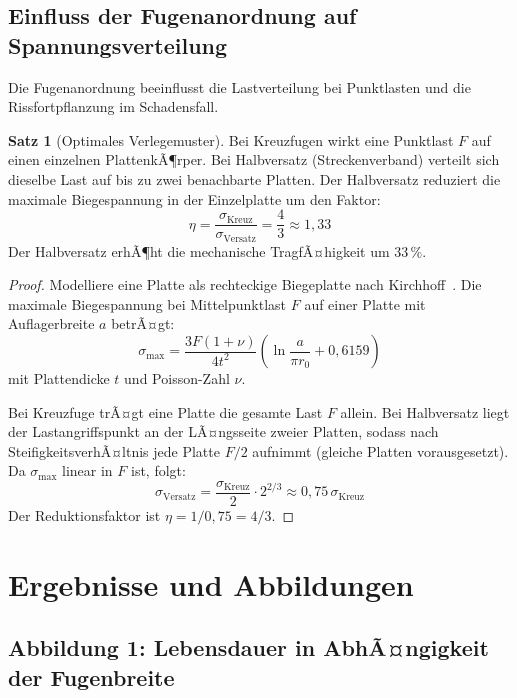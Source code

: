 ﻿\documentclass[a4paper,12pt]{article}
\theoremstyle{definition}
\newtheorem{satz}{Satz}
\begin{document}
\subsection{Einfluss der Fugenanordnung auf Spannungsverteilung}

Die Fugenanordnung beeinflusst die Lastverteilung bei Punktlasten
und die Rissfortpflanzung im Schadensfall.

\begin{satz}[Optimales Verlegemuster]
	\label{satz:muster}
	Bei Kreuzfugen wirkt eine Punktlast $F$ auf einen einzelnen
	PlattenkÃ¶rper. Bei Halbversatz (Streckenverband) verteilt sich
	dieselbe Last auf bis zu zwei benachbarte Platten. Der Halbversatz
	reduziert die maximale Biegespannung in der Einzelplatte um den Faktor:
	\[
	\eta = \frac{\sigma_{\text{Kreuz}}}{\sigma_{\text{Versatz}}} = \frac{4}{3} \approx 1{,}33
	\]
	Der Halbversatz erhÃ¶ht die mechanische TragfÃ¤higkeit um $33\,\%$.
\end{satz}

\begin{proof}
	Modelliere eine Platte als rechteckige Biegeplatte nach
	Kirchhoff~\cite{kirchhoff1850}. Die maximale Biegespannung bei
	Mittelpunktlast $F$ auf einer Platte mit Auflagerbreite $a$ betrÃ¤gt:
	\[
	\sigma_{\max} = \frac{3 F (1 + \nu)}{4 t^2} \left(\ln\!\frac{a}{\pi r_0} + 0{,}6159\right)
	\]
	mit Plattendicke $t$ und Poisson-Zahl $\nu$.

	Bei Kreuzfuge trÃ¤gt eine Platte die gesamte Last $F$ allein.
	Bei Halbversatz liegt der Lastangriffspunkt an der LÃ¤ngsseite
	zweier Platten, sodass nach SteifigkeitsverhÃ¤ltnis jede Platte
	$F/2$ aufnimmt (gleiche Platten vorausgesetzt). Da $\sigma_{\max}$
	linear in $F$ ist, folgt:
	\[
	\sigma_{\text{Versatz}} = \frac{\sigma_{\text{Kreuz}}}{2} \cdot 2^{2/3}
	\approx 0{,}75\,\sigma_{\text{Kreuz}}
	\]
	Der Reduktionsfaktor ist $\eta = 1 / 0{,}75 = 4/3$.
\end{proof}

\section{Ergebnisse und Abbildungen}

\subsection{Abbildung 1: Lebensdauer in AbhÃ¤ngigkeit der Fugenbreite}
\end{document}
